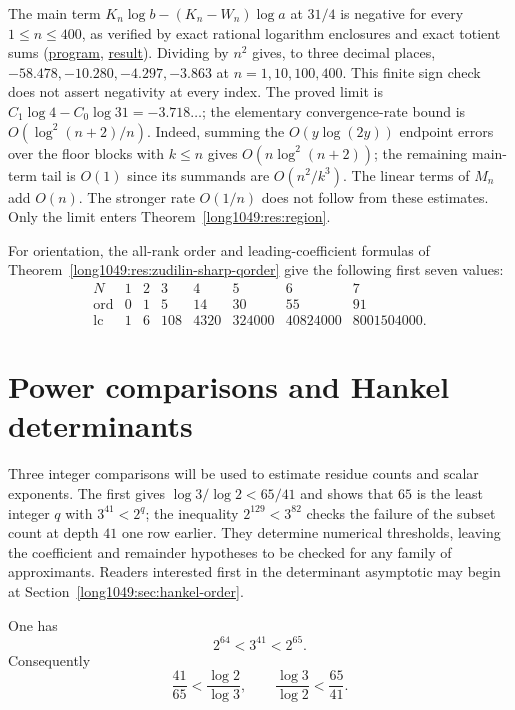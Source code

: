 \documentclass[11pt]{article}
\begin{document}
The main term $K_n\log b-(K_n-W_n)\log a$ at $31/4$ is negative
for every $1\le n\le400$, as verified by exact rational logarithm
enclosures and exact totient sums (\href{https://github.com/wcook04/plectis-erdos/blob/4beca4ad0c00a626def9c73f2420e20ebf8d1968/research/experiments/erdos1049/main_term_31_4.py}{program}, \href{https://github.com/wcook04/plectis-erdos/blob/4beca4ad0c00a626def9c73f2420e20ebf8d1968/research/experiments/erdos1049/receipts/main-term-31-4.json}{result}). Dividing by $n^2$ gives, to three
decimal places, $-58.478,-10.280,-4.297,-3.863$ at
$n=1,10,100,400$. This finite sign check does not assert negativity at
every index. The proved limit is
$C_1\log4-C_0\log31=-3.718\ldots$; the elementary convergence-rate bound
is $O(\log^2(n+2)/n)$.
Indeed, summing the $O(y\log(2y))$ endpoint errors over the floor blocks
with $k\le n$ gives $O(n\log^2(n+2))$; the remaining main-term tail is
$O(1)$ since its summands are $O(n^2/k^3)$.  The linear terms of $M_n$
add $O(n)$.  The stronger rate $O(1/n)$ does not follow from these estimates.  Only the limit enters Theorem~\ref{long1049:res:region}.

For orientation, the all-rank order and leading-coefficient formulas of
Theorem~\ref{long1049:res:zudilin-sharp-qorder} give the following first seven values:
\[
\begin{array}{c|rrrrrrr}
N&1&2&3&4&5&6&7\\\hline
\operatorname{ord}&0&1&5&14&30&55&91\\
\operatorname{lc}&1&6&108&4320&324000&40824000&8001504000.
\end{array}
\]


\section{Power comparisons and Hankel determinants}\label{long1049:sec:sharp}

Three integer comparisons will be used to estimate residue counts
and scalar exponents. The first gives $\log3/\log2<65/41$ and shows
that $65$ is the least integer $q$ with $3^{41}<2^q$; the inequality
$2^{129}<3^{82}$ checks the failure of the subset count at depth $41$
one row earlier. They determine numerical thresholds, leaving the
coefficient and remainder hypotheses to be checked for any family
of approximants. Readers interested first in the determinant
asymptotic may begin at Section~\ref{long1049:sec:hankel-order}.

\begin{theorem}\label{long1049:res:powerbracket}
One has
\[
 2^{64}<3^{41}<2^{65}.
\]
Consequently
\[
 \frac{41}{65}<\frac{\log2}{\log3},
 \qquad
 \frac{\log3}{\log2}<\frac{65}{41}.
\]
\end{theorem}
\end{document}
